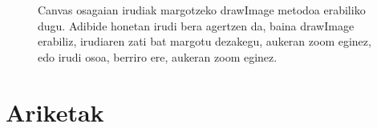 \begin{figure}[ht]
	\centering
{}
\caption{Canvas osagaian irudiak margotzeko drawImage metodoa erabiliko dugu. Adibide honetan irudi bera agertzen da, baina drawImage erabiliz, irudiaren zati bat margotu dezakegu, aukeran zoom eginez, edo irudi osoa, berriro ere, aukeran zoom eginez. }
\label{fig:canvasbuster}
\end{figure}




\section{Ariketak}

